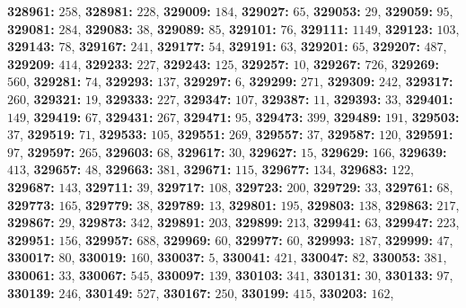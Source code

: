\textsf{\bfseries 328961:} $258$, \textsf{\bfseries 328981:} $228$, \textsf{\bfseries 329009:} $184$, \textsf{\bfseries 329027:} $65$, \textsf{\bfseries 329053:} $29$, \textsf{\bfseries 329059:} $95$, \textsf{\bfseries 329081:} $284$, \textsf{\bfseries 329083:} $38$, \textsf{\bfseries 329089:} $85$, \textsf{\bfseries 329101:} $76$, \textsf{\bfseries 329111:} $1149$, \textsf{\bfseries 329123:} $103$, \textsf{\bfseries 329143:} $78$, \textsf{\bfseries 329167:} $241$, \textsf{\bfseries 329177:} $54$, \textsf{\bfseries 329191:} $63$, \textsf{\bfseries 329201:} $65$, \textsf{\bfseries 329207:} $487$, \textsf{\bfseries 329209:} $414$, \textsf{\bfseries 329233:} $227$, \textsf{\bfseries 329243:} $125$, \textsf{\bfseries 329257:} $10$, \textsf{\bfseries 329267:} $726$, \textsf{\bfseries 329269:} $560$, \textsf{\bfseries 329281:} $74$, \textsf{\bfseries 329293:} $137$, \textsf{\bfseries 329297:} $6$, \textsf{\bfseries 329299:} $271$, \textsf{\bfseries 329309:} $242$, \textsf{\bfseries 329317:} $260$, \textsf{\bfseries 329321:} $19$, \textsf{\bfseries 329333:} $227$, \textsf{\bfseries 329347:} $107$, \textsf{\bfseries 329387:} $11$, \textsf{\bfseries 329393:} $33$, \textsf{\bfseries 329401:} $149$, \textsf{\bfseries 329419:} $67$, \textsf{\bfseries 329431:} $267$, \textsf{\bfseries 329471:} $95$, \textsf{\bfseries 329473:} $399$, \textsf{\bfseries 329489:} $191$, \textsf{\bfseries 329503:} $37$, \textsf{\bfseries 329519:} $71$, \textsf{\bfseries 329533:} $105$, \textsf{\bfseries 329551:} $269$, \textsf{\bfseries 329557:} $37$, \textsf{\bfseries 329587:} $120$, \textsf{\bfseries 329591:} $97$, \textsf{\bfseries 329597:} $265$, \textsf{\bfseries 329603:} $68$, \textsf{\bfseries 329617:} $30$, \textsf{\bfseries 329627:} $15$, \textsf{\bfseries 329629:} $166$, \textsf{\bfseries 329639:} $413$, \textsf{\bfseries 329657:} $48$, \textsf{\bfseries 329663:} $381$, \textsf{\bfseries 329671:} $115$, \textsf{\bfseries 329677:} $134$, \textsf{\bfseries 329683:} $122$, \textsf{\bfseries 329687:} $143$, \textsf{\bfseries 329711:} $39$, \textsf{\bfseries 329717:} $108$, \textsf{\bfseries 329723:} $200$, \textsf{\bfseries 329729:} $33$, \textsf{\bfseries 329761:} $68$, \textsf{\bfseries 329773:} $165$, \textsf{\bfseries 329779:} $38$, \textsf{\bfseries 329789:} $13$, \textsf{\bfseries 329801:} $195$, \textsf{\bfseries 329803:} $138$, \textsf{\bfseries 329863:} $217$, \textsf{\bfseries 329867:} $29$, \textsf{\bfseries 329873:} $342$, \textsf{\bfseries 329891:} $203$, \textsf{\bfseries 329899:} $213$, \textsf{\bfseries 329941:} $63$, \textsf{\bfseries 329947:} $223$, \textsf{\bfseries 329951:} $156$, \textsf{\bfseries 329957:} $688$, \textsf{\bfseries 329969:} $60$, \textsf{\bfseries 329977:} $60$, \textsf{\bfseries 329993:} $187$, \textsf{\bfseries 329999:} $47$, \textsf{\bfseries 330017:} $80$, \textsf{\bfseries 330019:} $160$, \textsf{\bfseries 330037:} $5$, \textsf{\bfseries 330041:} $421$, \textsf{\bfseries 330047:} $82$, \textsf{\bfseries 330053:} $381$, \textsf{\bfseries 330061:} $33$, \textsf{\bfseries 330067:} $545$, \textsf{\bfseries 330097:} $139$, \textsf{\bfseries 330103:} $341$, \textsf{\bfseries 330131:} $30$, \textsf{\bfseries 330133:} $97$, \textsf{\bfseries 330139:} $246$, \textsf{\bfseries 330149:} $527$, \textsf{\bfseries 330167:} $250$, \textsf{\bfseries 330199:} $415$, \textsf{\bfseries 330203:} $162$, 
